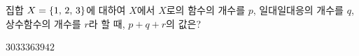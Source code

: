 \hspace*{2mm}\begin{minipage}[t]{\dimexpr\linewidth-2mm\relax}\vspace{0pt}
집합 $X=\{1,\mkern3mu 2,\mkern3mu 3\}$에 대하여 $X$에서 $X$로의 함수의 개수를 $p$, 일대일대응의 개수를 $q$, 상수함수의 개수를 $r$라 할 때, $p+q+r$의 값은?
\begin{choices32}{$30$}{$33$}{$36$}{$39$}{$42$}\end{choices32}\end{minipage}
